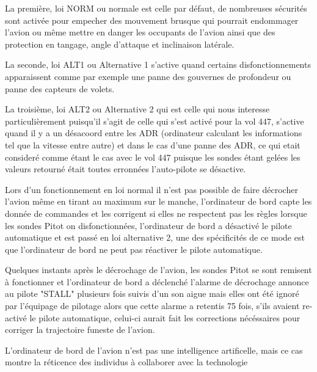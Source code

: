         La première, loi NORM ou normale est celle par défaut, de nombreuses sécurités sont activée pour empecher 
        des mouvement brusque qui pourrait endommager l'avion ou même mettre en danger 
        les occupants de l'avion ainsi que des protection en tangage, angle d'attaque et inclinaison 
        latérale. \newline 

        La seconde, loi ALT1 ou Alternative 1 s'active quand certains disfonctionnements apparaissent
        comme par exemple une panne des gouvernes de profondeur ou panne des capteurs de volets.
        \newline

        La troisième, loi ALT2 ou Alternative 2 qui est celle qui nous interesse particulièrement 
        puisqu'il s'agit de celle qui s'est activé pour la vol 447, s'active quand il y a un désacoord
        entre les ADR (ordinateur calculant les informations tel que la vitesse entre autre)
        et dans le cas d'une panne des ADR, ce qui etait consideré comme étant le cas avec 
        le vol 447 puisque les sondes étant gelées les valeurs retourné était toutes erronnées
        l'auto-pilote se désactive. 
        \newline

        Lors d'un fonctionnement en loi normal il n'est pas possible de faire décrocher l'avion 
        même en tirant au maximum sur le manche, l'ordinateur de bord 
        capte les donnée de commandes et les corrigent si elles ne respectent pas les règles 
        lorsque les sondes Pitot on disfonctionnées, l'ordinateur de bord a désactivé le 
        pilote automatique et est passé en loi alternative 2, une des spécificités 
        de ce mode est que l'ordinateur de bord ne peut pas réactiver le pilote automatique.
        \newline 

        Quelques instants après le décrochage de l'avion, les sondes Pitot se sont remisent 
        à fonctionner et l'ordinateur de bord a déclenché l'alarme de décrochage annonce
        au pilote "STALL" plusieurs fois suivis d'un son aigue mais elles ont été 
        ignoré par l'équipage de pilotage alors que cette alarme a retentis 75 fois, 
        s'ils avaient re-activé le pilote automatique, celui-ci aurait fait les
        corrections nécéssaires pour corriger la trajectoire funeste de l'avion. 
        
        L'ordinateur de bord de l'avion n'est pas une intelligence artificelle,
        mais ce cas montre la réticence des individus à collaborer avec la 
        technologie



        
        










        



        
        




